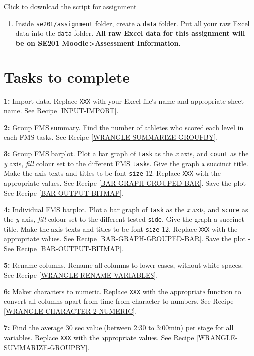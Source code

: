 \documentclass[
]{book}
\providecommand{\tightlist}{%
  \setlength{\itemsep}{0pt}\setlength{\parskip}{0pt}}
\begin{document}
Click to download the script for assignment

\begin{enumerate}
\def\labelenumi{\arabic{enumi}.}
\setcounter{enumi}{3}
\tightlist
\item
  Inside \texttt{se201/assignment} folder, create a \texttt{data} folder. Put all your raw Excel data into the \texttt{data} folder. \textbf{All raw Excel data for this assignment will be on SE201 Moodle\textgreater Assessment Information}.
\end{enumerate}

\hypertarget{tasks-to-complete}{%
\section{Tasks to complete}\label{tasks-to-complete}}

\textbf{1:} Import data. Replace \texttt{XXX} with your Excel file's name and appropriate sheet name. See Recipe \ref{INPUT-IMPORT}.

\textbf{2:} Group FMS summary. Find the number of athletes who scored each level in each FMS tasks. See Recipe \ref{WRANGLE-SUMMARIZE-GROUPBY}.

\textbf{3:} Group FMS barplot. Plot a bar graph of \texttt{task} as the \emph{x} axis, and \texttt{count} as the \emph{y} axis, \emph{fill} colour set to the different FMS \texttt{task}s. Give the graph a succinct title. Make the axis texts and titles to be font \texttt{size} 12. Replace \texttt{XXX} with the appropriate values. See Recipe \ref{BAR-GRAPH-GROUPED-BAR}. Save the plot - See Recipe \ref{BAR-OUTPUT-BITMAP}.

\textbf{4:} Individual FMS barplot. Plot a bar graph of \texttt{task} as the \emph{x} axis, and \texttt{score} as the \emph{y} axis, \emph{fill} colour set to the different tested \texttt{side}. Give the graph a succinct title. Make the axis texts and titles to be font \texttt{size} 12. Replace \texttt{XXX} with the appropriate values. See Recipe \ref{BAR-GRAPH-GROUPED-BAR}. Save the plot - See Recipe \ref{BAR-OUTPUT-BITMAP}.

\textbf{5:} Rename columns. Rename all columns to lower cases, without white spaces. See Recipe \ref{WRANGLE-RENAME-VARIABLES}.

\textbf{6:} Maker characters to numeric. Replace \texttt{XXX} with the appropriate function to convert all columns apart from time from character to numbers. See Recipe \ref{WRANGLE-CHARACTER-2-NUMERIC}.

\textbf{7:} Find the average 30 sec value (between 2:30 to 3:00min) per stage for all variables. Replace \texttt{XXX} with the appropriate values. See Recipe \ref{WRANGLE-SUMMARIZE-GROUPBY}.
\end{document}
